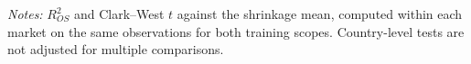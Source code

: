 \begin{table}[!ht]
\vspace{4pt}
\begin{minipage}{0.95\linewidth}\footnotesize
\textit{Notes:} $R^2_{OS}$ and Clark--West $t$ against the shrinkage mean, computed within each market on the same observations for both training scopes. Country-level tests are not adjusted for multiple comparisons.
\end{minipage}
\end{table}
